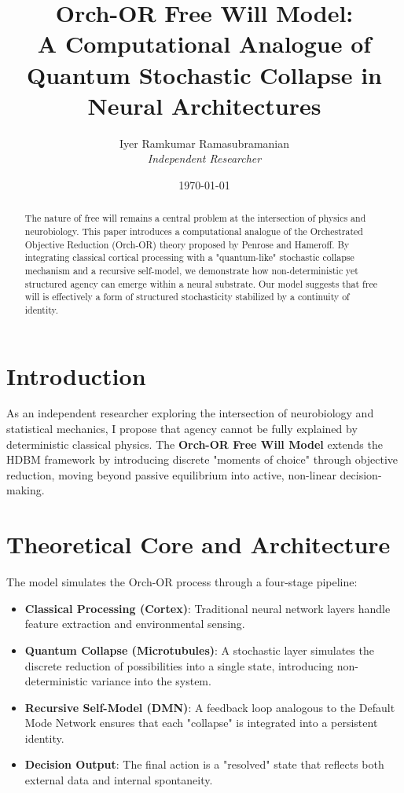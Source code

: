 \documentclass[12pt]{article}
\title{\textbf{Orch-OR Free Will Model: \\ A Computational Analogue of Quantum Stochastic Collapse in Neural Architectures}}
\author{Iyer Ramkumar Ramasubramanian \\ \textit{Independent Researcher}}
\date{\today}
\begin{document}
\maketitle

\begin{abstract}
The nature of free will remains a central problem at the intersection of physics and neurobiology. This paper introduces a computational analogue of the Orchestrated Objective Reduction (Orch-OR) theory proposed by Penrose and Hameroff. By integrating classical cortical processing with a "quantum-like" stochastic collapse mechanism and a recursive self-model, we demonstrate how non-deterministic yet structured agency can emerge within a neural substrate. Our model suggests that free will is effectively a form of structured stochasticity stabilized by a continuity of identity.
\end{abstract}

\section{Introduction}
As an independent researcher exploring the intersection of neurobiology and statistical mechanics, I propose that agency cannot be fully explained by deterministic classical physics. The \textbf{Orch-OR Free Will Model} extends the HDBM framework by introducing discrete "moments of choice" through objective reduction, moving beyond passive equilibrium into active, non-linear decision-making.

\section{Theoretical Core and Architecture}

The model simulates the Orch-OR process through a four-stage pipeline:

\begin{itemize}
\item \textbf{Classical Processing (Cortex)}: Traditional neural network layers handle feature extraction and environmental sensing.
\item \textbf{Quantum Collapse (Microtubules)}: A stochastic layer simulates the discrete reduction of possibilities into a single state, introducing non-deterministic variance into the system.
\item \textbf{Recursive Self-Model (DMN)}: A feedback loop analogous to the Default Mode Network ensures that each "collapse" is integrated into a persistent identity.
\item \textbf{Decision Output}: The final action is a "resolved" state that reflects both external data and internal spontaneity.
\end{itemize}
\end{document}
